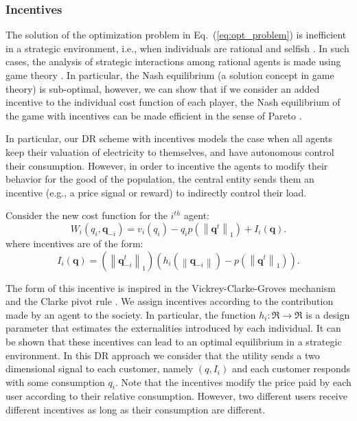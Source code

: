 \documentclass[a4paper,10pt]{article}
\newcommand{\bs}[1]{\boldsymbol{#1}}
\newcommand{\norm}[1]{\left\lVert#1\right\rVert}
\begin{document}
\subsubsection{Incentives}

The solution of the optimization problem in Eq.~(\ref{eq:opt_problem}) is inefficient in a strategic environment, i.e., when individuals are rational and selfish \cite{barreto2013design, Johari09}. In such cases, the analysis of strategic interactions among rational agents is made using game theory \cite{fudenberg98}.
In particular, the Nash equilibrium (a solution concept in game theory)  is sub-optimal, however, we can show that if we consider an added incentive to the individual cost function of each player, the Nash equilibrium of the game with incentives can be made efficient in the sense of Pareto \cite{barreto2013design, barreto2014incentives}. 

In particular, our DR scheme with incentives models the case when all agents keep their valuation of electricity to themselves, and have autonomous control their consumption. However, in order to incentive the agents to modify their behavior for the good of the population, the central entity sends them an incentive (e.g., a price signal or reward) to indirectly control their load.

Consider the new cost function for the $i^{th}$ agent:
\begin{equation}\label{eq:game2}
W_i(q_i,\bs{q}_{-i}) 
= v_i(q_i) -  q_i p\left( \norm{\bs{q}^t}_1 \right) + I_i(\bs{q}) .
\end{equation}
where incentives are of the form:
\begin{equation}\label{eq:I_i}
I_i(\bs{q}) = \left( \norm{\bs{q}_{-i}^t}_1\right) \left( h_i(\norm{\bs{q}_{-i}})  - p\left( \norm{\bs{q}^t}_1 \right) \right).
\end{equation}


The form of this incentive is inspired in the 
Vickrey-Clarke-Groves mechanism and the  Clarke pivot rule \cite{AlgorithmicG}.
%
We assign incentives according to the contribution made by an agent 
to the society. In particular, the function $h_i:\Re \to \Re$ is a design parameter that estimates the externalities introduced by each individual.
It can be shown that these incentives can lead to an optimal equilibrium in a strategic environment.
In this DR approach we consider that the utility sends a two dimensional signal to each customer, namely $(q,I_i)$ and each customer responds with some consumption $q_i$. 
Note that the incentives modify the price paid by each user according to their relative consumption. However, two different users receive different incentives as long as their consumption are different.
\end{document}

